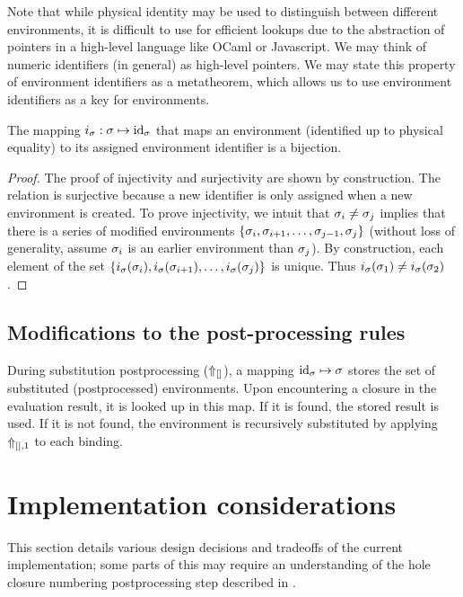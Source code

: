 Note that while physical identity may be used to distinguish between different environments, it is difficult to use for efficient lookups due to the abstraction of pointers in a high-level language like OCaml or Javascript. We may think of numeric identifiers (in general) as high-level pointers. We may state this property of environment identifiers as a metatheorem, which allows us to use environment identifiers as a key for environments.

\begin{theorem}
  The mapping $i_\sigma:\sigma\mapsto\text{id}_\sigma$ that maps an environment (identified up to physical equality) to its assigned environment identifier is a bijection.
  \label{thm:env-id}
\end{theorem}

\begin{proof}
  The proof of injectivity and surjectivity are shown by construction. The relation is surjective because a new identifier is only assigned when a new environment is created. To prove injectivity, we intuit that $\sigma_i\ne\sigma_j$ implies that there is a series of modified environments $\{\sigma_i,\sigma_{i+1},\dots,\sigma_{j-1},\sigma_j\}$ (without loss of generality, assume $\sigma_i$ is an earlier environment than $\sigma_j$). By construction, each element of the set $\{i_\sigma(\sigma_i),i_\sigma(\sigma_{i+1}),\dots,i_\sigma(\sigma_j)\}$ is unique. Thus $i_\sigma(\sigma_1)\ne i_\sigma(\sigma_2)$.
\end{proof}

\subsection{Modifications to the post-processing rules}
\label{sec:memoization-postprocessing}

During substitution postprocessing ($\Uparrow_{[]}$), a mapping $\text{id}_\sigma\mapsto\sigma$ stores the set of substituted (postprocessed) environments. Upon encountering a closure in the evaluation result, it is looked up in this map. If it is found, the stored result is used. If it is not found, the environment is recursively substituted by applying $\Uparrow_{[],1}$ to each binding.

\section{Implementation considerations}
\label{sec:evalenv_impl_considerations}

This section details various design decisions and tradeoffs of the current implementation; some parts of this may require an understanding of the hole closure numbering postprocessing step described in .

